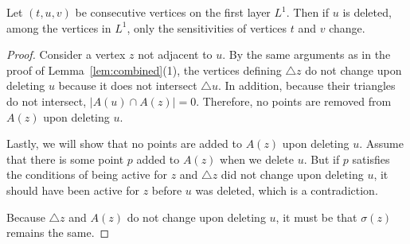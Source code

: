 \documentclass{cccg24}
\newcommand{\lrParents}[1]{\left( #1 \right)}
\newcommand{\TriS}[1]{\triangle #1}
\newcommand{\sens}[1]{\sigma\!\lrParents{#1}}
\newenvironment{customlemma}[1]
  {\renewcommand\theinnercustomthm{#1}\innercustomthm}
  {\endinnercustomthm}
\begin{document}
\begin{customlemma}{\ref{lem:combined}(4)}
    Let $(t, u, v)$ be consecutive vertices on the first layer $L^1$. Then if $u$ is deleted, among the vertices in $L^1$, only the sensitivities of vertices $t$ and $v$ change.
\end{customlemma}
\begin{proof}
    Consider a vertex $z$ not adjacent to $u$. By the same arguments as in the proof of Lemma~\ref{lem:combined}(1), the vertices defining $\TriS z$ do not change upon deleting $u$ because it does not intersect $\TriS u$. In addition, because their triangles do not intersect, $|A(u) \cap A(z)| = 0$. Therefore, no points are removed from $A(z)$ upon deleting $u$. 

    Lastly, we will show that no points are added to $A(z)$ upon deleting $u$. Assume that there is some point $p$ added to $A(z)$ when we delete $u$. But if $p$ satisfies the conditions of being active for $z$ and $\TriS z$ did not change upon deleting $u$, it should have been active for $z$ before $u$ was deleted, which is a contradiction.

    Because $\TriS z$ and $A(z)$ do not change upon deleting $u$, it must be that $\sens z$ remains the same.
\end{proof}

\end{document}
